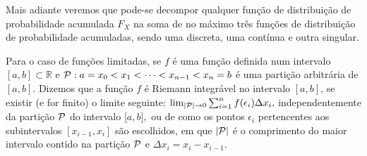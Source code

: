 %
\begin{frame}
Mais adiante veremos que pode-se decompor qualquer função de distribuição de probabilidade
acumulada $F_X$ na soma de no máximo três
funções de distribuição de probabilidade acumuladas, sendo uma
discreta, uma contínua e outra singular.

\begin{nota}{Para o caso de funções limitadas, se $f$ é uma função definida num intervalo $[a, b] \subset \mathbb{R}$ e
		${\cal P} : a = x_0 < x_1 < \cdots < x_{n-1} < x_n = b$ é uma partição arbitrária de $[a, b].$ Dizemos que a função $f$ é Riemann integrável no intervalo $[a, b]$, se existir (e for finito) o limite seguinte:
		$\lim_{ |{\cal P}|\rightarrow 0 }\sum_{i=1}^n f(\epsilon_i) \Delta x_i,$ independentemente da partição ${\cal P}$ do intervalo [$a, b],$  ou de como os pontos
		$\epsilon_i$ pertencentes aos subintervalos $[x_{i-1} , x_i ]$ são escolhidos, em que $|{\cal P}|$ é o comprimento do maior intervalo contido na partição ${\cal P}$ e $\Delta x_i= x_i-x_{i-1}.$}
\end{nota}

\end{frame}
%
